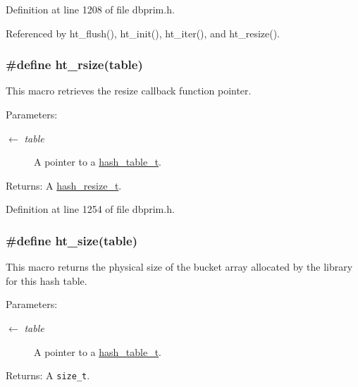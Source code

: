 Definition at line 1208 of file dbprim.h.

Referenced by ht\_\-flush(), ht\_\-init(), ht\_\-iter(), and ht\_\-resize().\hypertarget{group__dbprim__hash_ga34}{
\subsubsection[ht\_\-rsize]{\setlength{\rightskip}{0pt plus 5cm}\#define ht\_\-rsize(table)}}
\label{group__dbprim__hash_ga34}


This macro retrieves the resize callback function pointer.

\begin{Desc}
\item[Parameters:]
\begin{description}
\item[\mbox{$\leftarrow$} {\em table}]A pointer to a \hyperlink{group__dbprim__hash_ga1}{hash\_\-table\_\-t}.\end{description}
\end{Desc}
\begin{Desc}
\item[Returns:]A \hyperlink{group__dbprim__hash_ga6}{hash\_\-resize\_\-t}.\end{Desc}


Definition at line 1254 of file dbprim.h.\hypertarget{group__dbprim__hash_ga36}{
\subsubsection[ht\_\-size]{\setlength{\rightskip}{0pt plus 5cm}\#define ht\_\-size(table)}}
\label{group__dbprim__hash_ga36}


This macro returns the physical size of the bucket array allocated by the library for this hash table.

\begin{Desc}
\item[Parameters:]
\begin{description}
\item[\mbox{$\leftarrow$} {\em table}]A pointer to a \hyperlink{group__dbprim__hash_ga1}{hash\_\-table\_\-t}.\end{description}
\end{Desc}
\begin{Desc}
\item[Returns:]A {\tt size\_\-t}.\end{Desc}


